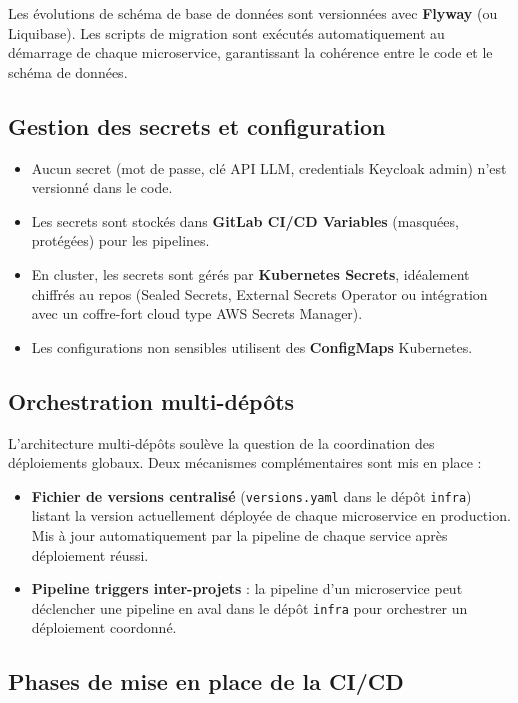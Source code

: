 \documentclass[12pt,a4paper]{article}
\begin{document}
Les évolutions de schéma de base de données sont versionnées avec \textbf{Flyway} (ou Liquibase). Les scripts de migration sont exécutés automatiquement au démarrage de chaque microservice, garantissant la cohérence entre le code et le schéma de données.

\subsection{Gestion des secrets et configuration}

\begin{itemize}[leftmargin=*,itemsep=4pt]
    \item Aucun secret (mot de passe, clé API LLM, credentials Keycloak admin) n'est versionné dans le code.
    \item Les secrets sont stockés dans \textbf{GitLab CI/CD Variables} (masquées, protégées) pour les pipelines.
    \item En cluster, les secrets sont gérés par \textbf{Kubernetes Secrets}, idéalement chiffrés au repos (Sealed Secrets, External Secrets Operator ou intégration avec un coffre-fort cloud type AWS Secrets Manager).
    \item Les configurations non sensibles utilisent des \textbf{ConfigMaps} Kubernetes.
\end{itemize}

\subsection{Orchestration multi-dépôts}

L'architecture multi-dépôts soulève la question de la coordination des déploiements globaux. Deux mécanismes complémentaires sont mis en place :

\begin{itemize}[leftmargin=*,itemsep=4pt]
    \item \textbf{Fichier de versions centralisé} (\texttt{versions.yaml} dans le dépôt \texttt{infra}) listant la version actuellement déployée de chaque microservice en production. Mis à jour automatiquement par la pipeline de chaque service après déploiement réussi.
    \item \textbf{Pipeline triggers inter-projets} : la pipeline d'un microservice peut déclencher une pipeline en aval dans le dépôt \texttt{infra} pour orchestrer un déploiement coordonné.
\end{itemize}

\subsection{Phases de mise en place de la CI/CD}
\end{document}
